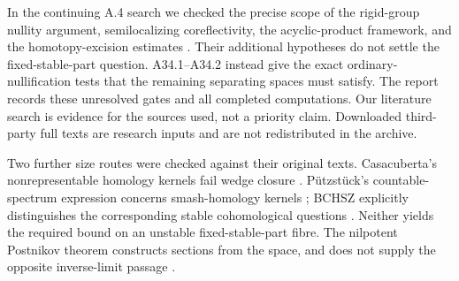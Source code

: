 In the continuing A.4 search we checked the precise scope of the rigid-group nullity argument, semilocalizing coreflectivity, the acyclic-product framework, and the homotopy-excision estimates \citep{A4Stanley,A4CasacubertaGutierrezRosicky,A4AnelBiedermannFinsterJoyal,A4ChacholskiSchererWerndli}. Their additional hypotheses do not settle the fixed-stable-part question. A34.1--A34.2 instead give the exact ordinary-nullification tests that the remaining separating spaces must satisfy. The report records these unresolved gates and all completed computations. Our literature search is evidence for the sources used, not a priority claim. Downloaded third-party full texts are research inputs and are not redistributed in the archive.

Two further size routes were checked against their original texts.
Casacuberta's nonrepresentable homology kernels fail wedge closure
\citep[Theorem~7.1 and Corollary~7.2]{A4CasacubertaOhkawa2020}.
P\"utzst\"uck's countable-spectrum expression concerns smash-homology
kernels \citep[Theorem~1.4]{A4Putzstuck2026}; BCHSZ explicitly distinguishes
the corresponding stable cohomological questions
\citep[Remarks~2.3, 2.9--2.10]{A4BCHSZ2026}.
Neither yields the required bound on an unstable fixed-stable-part fibre.
The nilpotent Postnikov theorem constructs sections from the space,
and does not supply the opposite inverse-limit passage
\citep[Theorem~6.6]{A4CFFS2015}.
